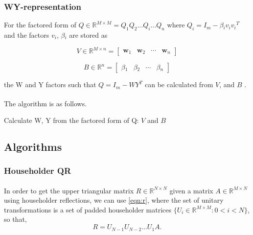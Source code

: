 \documentclass{article}
\begin{document}
\subsubsection{WY-representation}

For the factored form of $Q \in \mathbb{R}^{M \times M} = {Q_1}{Q_2}{\dots}{Q_i}{\dots}{Q_n}$ where $Q_i = {I_m} - {\beta{}_i}{v_i}{v_i}^T$ and the factors ${v_i}$, ${\beta{}_i}$ are stored as  

\begin{equation}
V \in \mathbb{R}^{M \times n} =
\begin{bmatrix}
\mathbf{w}_1 & \mathbf{w}_2 & \cdots & \mathbf{w}_{n}
\end{bmatrix}
\end{equation}

\begin{equation}
B \in \mathbb{R}^{n} = 
\begin{bmatrix}
\beta{}_1 & \beta{}_2 & \cdots & \beta{}_{n}
\end{bmatrix}
\end{equation}

 the W and Y factors such that $Q = I_m - {W}{Y}^T$ can be calculated from $V$, and $B$ \cite{golub} \cite{doi:10.1137/19M1296367}.

\paragraph{}
The algorithm is as follows.

\begin{algorithm}
\caption{Calculate W, Y from the factored form of Q: $V$ and $B$}
\label{wy}
\begin{algorithmic}
\ENDFOR
\end{algorithmic}
\end{algorithm}

\subsection{Algorithms}
\subsubsection{Householder QR}
\paragraph{}
In order to get the upper triangular matrix $R \in\mathbb{R}^{N\times{}N}$ given a matrix $A \in\mathbb{R}^{M\times{}N}$ using householder reflections, we can use \eqref{eqn:r}, where the set of unitary transformations is a set of padded householder matrices $\{U_i\in\mathbb{R}^{M\times{}M} : 0 < i < N\}$, so that,
\begin{equation}
R = U_{N-1} U_{N-2} \dots U_1A.
\end{equation}
\end{document}
